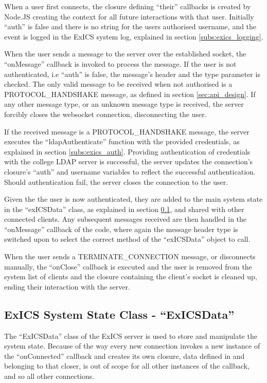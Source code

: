 When a user first connects, the closure defining ``their'' callbacks is created by Node.JS creating the context for all future interactions with that user.  Initially ``auth'' is false and there is no string for the users authorised username, and the event is logged in the ExICS system log, explained in section \ref{subs:exics_logging}.

When the user sends a message to the server over the established socket, the ``onMessage'' callback is invoked to process the message.  If the user is not authenticated, i.e ``auth'' is false, the message's header and the type parameter is checked.  The only valid message to be received when not authorised is a PROTOCOL\_HANDSHAKE message, as defined in section \ref{sec:api_design}.  If any other message type, or an unknown message type is received, the server forcibly closes the websocket connection, disconnecting the user.

If the received message is a PROTOCOL\_HANDSHAKE message, the server executes the ``ldapAuthenticate'' function with the provided credentials, as explained in section \ref{subs:exics_auth}.  Providing authentication of credentials with the college LDAP server is successful, the server updates the connection's closure's ``auth'' and username variables to reflect the successful authentication.  Should authentication fail, the server closes the connection to the user.

Given the the user is now authenticated, they are added to the main system state in the ``exICSData'' class, as explained in section \ref{subs:exics_data}, and shared with other connected clients. Any subsequent messages received are then handled in the ``onMessage'' callback of the code, where again the message header type is switched upon \cite{jsswitch} to select the correct method of the ``exICSData'' object to call.

When the user sends a TERMINATE\_CONNECTION message, or disconnects manually, the ``onClose'' callback is executed and the user is removed from the system list of clients and the closure containing the client's socket is cleaned up, ending their interaction with the server.

\subsection{ExICS System State Class - ``ExICSData''}
\label{subs:exics_data}

The ``ExICSData'' class of the ExICS server is used to store and manipulate the system state.  Because of the way every new connection invokes a new instance of the ``onConnected'' callback and creates its own closure, data defined in and belonging to that closer, is out of scope for all other instances of the callback, and so all other connections.

